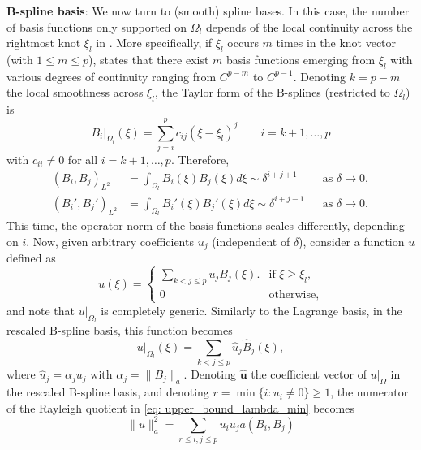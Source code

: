 \documentclass{article}
\numberwithin{equation}{section}
\newcommand{\dxi}{d\xi}
\newcommand{\restr}[2]{\left.{#1}\right|_{#2}}
\theoremstyle{definition}
\begin{document}
\noindent \textbf{B-spline basis}:
We now turn to (smooth) spline bases. In this case, the number of basis functions only supported on $\Omega_l$ depends of the local continuity across the rightmost knot $\xi_l$ in . More specifically, if $\xi_l$ occurs $m$ times in the knot vector (with $1 \leq m \leq p$),  states that there exist $m$ basis functions emerging from $\xi_l$ with various degrees of continuity ranging from $C^{p-m}$ to $C^{p-1}$. Denoting $k=p-m$ the local smoothness across $\xi_l$, the Taylor form of the B-splines (restricted to $\Omega_l$) is
\begin{equation*}
    \restr{B_i}{\Omega_l}(\xi) = \sum_{j=i}^p c_{ij}(\xi-\xi_l)^j \qquad i=k+1,\dots,p
\end{equation*}
with $c_{ii} \neq 0$ for all $i=k+1,\dots,p$. Therefore,
\begin{align}
    (B_i,B_j)_{L^2} &= \int_{\Omega_l} B_i(\xi)B_j(\xi) \dxi \sim \delta^{i+j+1} & &\text{as } \delta \to 0, \label{eq: L2_Bspline} \\
    (B_i',B_j')_{L^2} &= \int_{\Omega_l} B_i'(\xi)B_j'(\xi) \dxi \sim \delta^{i+j-1} & &\text{as } \delta \to 0. \label{eq: H1_Bspline}
\end{align}
This time, the operator norm of the basis functions scales differently, depending on $i$. Now, given arbitrary coefficients $u_j$ (independent of $\delta$), consider a function $u$ defined as
\begin{equation*}
    u(\xi) =
    \begin{cases}
        \sum_{k< j \leq p} u_j B_j(\xi). & \text{if } \xi \geq \xi_l, \\
        0 & \text{otherwise},
    \end{cases}
\end{equation*}
and note that $\restr{u}{\Omega_l}$ is completely generic. Similarly to the Lagrange basis, in the rescaled B-spline basis, this function becomes
\begin{equation*}
    \restr{u}{\Omega_l}(\xi) = \sum_{k< j \leq p} \hat{u}_j \hat{B}_j(\xi),
\end{equation*}
where $\hat{u}_j = \alpha_ju_j$ with $\alpha_j=\|B_j\|_a$. Denoting $\hat{\bm{u}}$ the coefficient vector of $\restr{u}{\Omega}$ in the rescaled B-spline basis, and denoting $r=\min \{i \colon u_i \neq 0\} \geq 1$, the numerator of the Rayleigh quotient in \eqref{eq: upper_bound_lambda_min} becomes
\begin{equation*}
    \|u\|_a^2 = \sum_{r \leq i,j \leq p} u_iu_j a(B_i,B_j)
\end{equation*}
\end{document}
